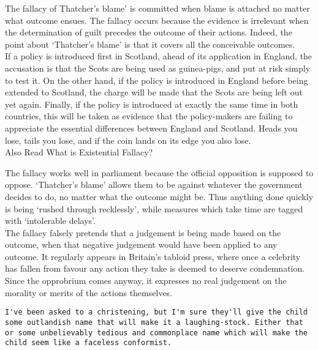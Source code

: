 \documentclass[a4paper,12pt,single,pdftex]{scrartcl}
\begin{document}
    
      The fallacy of Thatcher’s blame’ is committed when blame is attached no matter what outcome ensues. The fallacy occurs because the evidence is irrelevant when the determination of guilt precedes the outcome of their actions. Indeed, the point about ‘Thatcher’s blame’ is that it covers all the conceivable outcomes.
    \\

    
      If a policy is introduced first in Scotland, ahead of its application in England, the accusation is that the Scots are being used as guinea-pigs, and put at risk simply to test it. On the other hand, if the policy is introduced in England before being extended to Scotland, the charge will be made that the Scots are being left out yet again. Finally, if the policy is introduced at exactly the same time in both countries, this will be taken as evidence that the policy-makers are failing to appreciate the essential differences between England and Scotland. Heads you lose, tails you lose, and if the coin lands on its edge you also lose.
    \\

    
      

      
        Also Read  What is Existential Fallacy?
      
    
    
      The fallacy works well in parliament because the official opposition is supposed to oppose. ‘Thatcher’s blame’ allows them to be against whatever the government decides to do, no matter what the outcome might be. Thus anything done quickly is being ‘rushed through recklessly’, while measures which take time are tagged with ‘intolerable delays’.
    \\

    
      The fallacy falsely pretends that a judgement is being made based on the outcome, when that negative judgement would have been applied to any outcome. It regularly appears in Britain’s tabloid press, where once a celebrity has fallen from favour any action they take is deemed to deserve condemnation. Since the opprobrium comes anyway, it expresses no real judgement on the morality or merits of the actions themselves.
    \\

    \begin{verbatim}I've been asked to a christening, but I'm sure they'll give the child some outlandish name that will make it a laughing-stock. Either that or some unbelievably tedious and commonplace name which will make the child seem like a faceless conformist.\end{verbatim}
    
\end{document}
